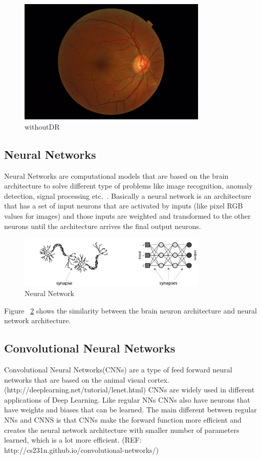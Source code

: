 \begin{figure}[t]
\caption{withoutDR}
\label{fignoDR}
\centering
\includegraphics[width=0.8\textwidth]{Figures/NODR}
\end{figure}

\subsection{Neural Networks}
Neural Networks are computational models that are based on the brain architecture to solve different type of problems like image recognition, anomaly detection, signal processing etc.\ \citep{shiffman2012nature}. Basically a neural network is an architecture that has a set of input neurons that are activated by inputs (like pixel RGB values for images) and those inputs are weighted and transformed to the other neurons until the architecture arrives the final output neurons. 

\begin{figure}[t]
\caption{Neural Network}
\label{fignn}
\centering
\includegraphics[width=0.8\textwidth]{Figures/nn}
\end{figure}

Figure ~\ref{fignn} shows the similarity between the brain neuron architecture and neural network architecture. 

\subsection{Convolutional Neural Networks}
Convolutional Neural Networks(CNNs) are a type of feed forward neural networks that are based on the animal visual cortex. (http://deeplearning.net/tutorial/lenet.html) CNNs are widely used in different applications of Deep Learning. 
Like regular NNs CNNs also have neurons that have weights and biases that can be learned. The main different between regular NNs and CNNS is that CNNs make the forward function more efficient and creates the neural network architecture with smaller number of parameters learned, which is a lot more efficient. (REF: http://cs231n.github.io/convolutional-networks/) 

